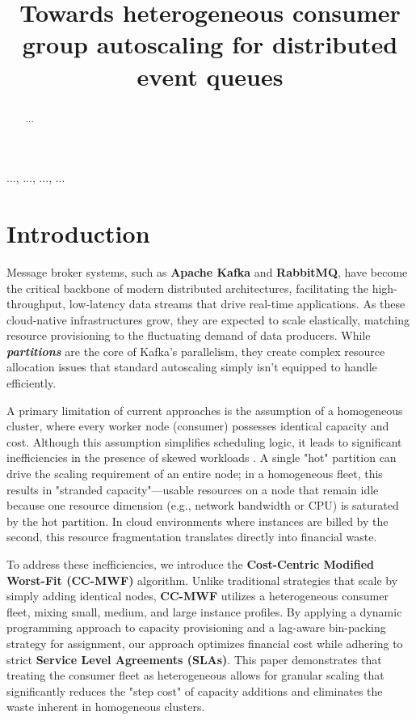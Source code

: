 ﻿\documentclass[conference]{IEEEtran}
\title{Towards heterogeneous consumer group autoscaling for distributed event queues}
\author{\IEEEauthorblockN{Anonymous}}
\begin{document}
\maketitle

\begin{abstract}
...
\end{abstract}

\begin{IEEEkeywords}
  ..., ..., ..., ...
\end{IEEEkeywords}

\section{Introduction}
Message broker systems, such as \textbf{Apache Kafka} and \textbf{RabbitMQ}, have become the critical backbone of modern distributed architectures, facilitating the high-throughput, low-latency data streams that drive real-time applications. As these cloud-native infrastructures grow, they are expected to scale elastically, matching resource provisioning to the fluctuating demand of data producers. While \textbf{\textit{partitions}} are the core of Kafka's parallelism, they create complex resource allocation issues that standard autoscaling simply isn't equipped to handle efficiently. \cite{Landau2025}

A primary limitation of current approaches is the assumption of a homogeneous cluster, where every worker node (consumer) possesses identical capacity and cost. Although this assumption simplifies scheduling logic, it leads to significant inefficiencies in the presence of skewed workloads \cite{Boghani2025}. A single "hot" partition can drive the scaling requirement of an entire node; in a homogeneous fleet, this results in "stranded capacity"—usable resources on a node that remain idle because one resource dimension (e.g., network bandwidth or CPU) is saturated by the hot partition. In cloud environments where instances are billed by the second, this resource fragmentation translates directly into financial waste. \cite{Jackson2025}

To address these inefficiencies, we introduce the \textbf{Cost-Centric Modified Worst-Fit (CC-MWF)} algorithm. Unlike traditional strategies that scale by simply adding identical nodes, \textbf{CC-MWF} utilizes a heterogeneous consumer fleet, mixing small, medium, and large instance profiles. By applying a dynamic programming approach to capacity provisioning and a lag-aware bin-packing strategy for assignment, our approach optimizes financial cost while adhering to strict \textbf{Service Level Agreements (SLAs)}. This paper demonstrates that treating the consumer fleet as heterogeneous allows for granular scaling that significantly reduces the "step cost" of capacity additions and eliminates the waste inherent in homogeneous clusters.
\end{document}
